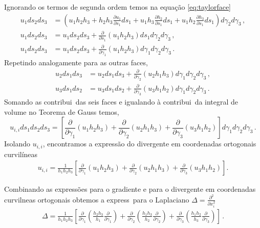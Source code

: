 Ignorando os termos de segunda ordem temos na equa\c{c}\~ao \ref{eq:taylorface}
\begin{align}
  u_1ds_2ds_3 &= \left(u_1h_2h_3 + h_2h_3\frac{\partial u_1}{\partial
  s_1}ds_1 +
  u_1h_3\frac{\partial h_2}{\partial s_1}ds_1 + u_1h_2\frac{\partial
  h_3}{\partial s_1}ds_1
  \right)d\gamma_2d\gamma_3\, , \\
  u_1ds_2ds_3 &= u_1ds_2ds_3+\frac{\partial}{\partial
  s_1}(u_1h_2h_3)ds_1d\gamma_2d\gamma_3\, , \\
  u_1ds_2ds_3 &= u_1ds_2ds_3+\frac{\partial}{\partial
  \gamma_1}(u_1h_2h_3)d\gamma_1d\gamma_2d\gamma_3\,  .
\end{align}
Repetindo analogamente para as outras faces,
\begin{align}
  u_2ds_1ds_3 &= u_2ds_1ds_3+\frac{\partial}{\partial
  \gamma_2}(u_2h_1h_3)d\gamma_1d\gamma_2d\gamma_3\,  , \\
  u_3ds_1ds_2 &= u_3ds_1ds_2+\frac{\partial}{\partial
  \gamma_3}(u_3h_1h_2)d\gamma_1d\gamma_2d\gamma_3\,  .
\end{align}
Somando as contribui\coes\ das seis faces e igualando \`a contribui\cao\ da integral de volume no 
Teorema de Gauss temos,
\begin{equation}
  u_{i,i}ds_1ds_2ds_3 = \left[\frac{\partial}{\partial \gamma_1} (u_1 h_2 h_3 ) +
  \frac{\partial}{\partial \gamma_{2}}(u_2h_1h_3) +  
  \frac{\partial}{\partial\gamma_{3}}(u_{3}h_{1}h_{2})\right]d\gamma_{1}d\gamma_{2}d\gamma_3 \, .
\end{equation}
Isolando $u_{i,i}$, encontramos a express\~ao do divergente em coordenadas
ortogonais curvi\-l\'ineas 
\begin{eqnarray}
  u_{i,i}=\frac{1}{h_{1}h_{2}h_{3}}\left[\frac{\partial}{\partial\gamma_{1}}(u_{1}h_{2}h_{3}) 
       +\frac{\partial}{\partial \gamma_{2}}(u_{2}h_{1}h_{3})  
       +\frac{\partial}{\partial \gamma_{3}}(u_{3}h_{1}h_{2})\right].
\end{eqnarray}

Combinando as express\~oes para o gradiente e para o divergente em coordenadas curvil\ih neas 
ortogonais obtemos a express\ao\ para o 
Laplaciano $\Delta = \frac{\partial^{2}}{\partial x_{i}^{2}}$
\begin{eqnarray}
\Delta = \frac{1}{h_1 h_2 h_3}\left[\frac{\partial}{\partial\gamma_1}\left(\frac{h_2 h_3}{h_1}
  \frac{\partial}{\partial\gamma_1}\right) +
\frac{\partial}{\partial\gamma_{2}}\left(\frac{h_{1}h_{3}}{h_{2}}
  \frac{\partial}{\partial\gamma_{2}}\right)+
 \frac{\partial}{\partial\gamma_{3}}\left(\frac{h_{1}h_{2}}{h_{3}}
  \frac{\partial}{\partial\gamma_{3}}\right)\right]\, .
\end{eqnarray}

